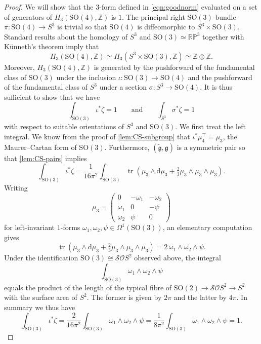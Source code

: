 \documentclass[10pt,a4paper]{amsart}
\newcommand\Cal{\mathcal}
\newcommand{\Z}{\mathbb{Z}}
\newcommand{\col}{:}
\renewcommand*{\d}{\mathrm{d}}
\newcommand{\tr}{\operatorname{tr}}
\begin{document}
\begin{proof}
We will show that the $3$-form defined in \eqref{eqn:goodnorm} evaluated on a set of
generators of $H_3(\mathrm{SO}(4),\Z)$ is $1$.  The principal right
$\mathrm{SO}(3)$-bundle $\pi \col \mathrm{SO}(4) \to S^3$ is trivial so that
$\mathrm{SO}(4)$ is diffeomorphic to $S^3\times \mathrm{SO}(3)$. Standard results
about the homology of $S^3$ and $\mathrm{SO}(3)\simeq \mathbb{RP}^3$ together with
K\"unneth's theorem imply that
\[
H_3(\mathrm{SO}(4),\Z)\simeq H_3(S^3\times \mathrm{SO}(3),\Z)\simeq \Z \oplus \Z. 
\]
Moreover, $H_3(\mathrm{SO}(4),\Z)$ is generated by the pushforward of the fundamental
class of $\mathrm{SO}(3)$ under the inclusion $\iota \col \mathrm{SO}(3) \to
\mathrm{SO}(4)$ and the pushforward of the fundamental class of $S^3$ under a section
$\sigma \col S^3 \to \mathrm{SO}(4)$. It is thus sufficient to show that we have
\begin{equation}\label{eqn:integrals}
\int_{\mathrm{SO}(3)}\iota^*\zeta=1 \qquad \text{and}\qquad \int_{S^3}\sigma^*\zeta=1
\end{equation}
with respect to suitable orientations of $S^3$ and $\mathrm{SO}(3)$. We first treat
the left integral.  We know from the proof of \cref{lem:CS-subgroup}
  that $\iota^*\mu_4^\top=\mu_3$, the Maurer--Cartan form of
$\mathrm{SO}(3)$. Furthermore, $(\tilde{\mathfrak{g}},\mathfrak{g})$ is a symmetric
pair so that \cref{lem:CS-pairs} implies
\[
\int_{\mathrm{SO}(3)}\iota^*\zeta=\frac{1}{16\pi^2}\int_{\mathrm{SO}(3)}\tr\left(\mu_3\wedge\d\mu_3+\tfrac{2}{3}\mu_3\wedge\mu_3\wedge\mu_3\right).
\]
Writing
\[
\mu_3=\begin{pmatrix} 0 & -\omega_1 & -\omega_2 \\ \omega_1 & 0 & -\psi \\ \omega_2 & \psi & 0 \end{pmatrix}
\]
for left-invariant $1$-forms $\omega_1,\omega_2,\psi \in \Omega^1(\mathrm{SO}(3))$, an elementary computation gives
\[
\tr\left(\mu_3\wedge\d\mu_3+\tfrac{2}{3}\mu_3\wedge\mu_3\wedge\mu_3\right)=2\,\omega_1\wedge\omega_2\wedge\psi.
\]
Under the identification $\mathrm{SO}(3)\cong\Cal{SO}S^2$ observed above, the integral 
\[
\int_{\mathrm{SO}(3)}\omega_1\wedge\omega_2\wedge\psi
\] 
equals the product of the length of the typical fibre of $\mathrm{SO}(2)\to \mathcal{SO}S^2 \to S^2$ with the surface area of $S^2$. The former is given by $2\pi$ and the latter by $4\pi$. In summary we thus have
\[
\int_{\mathrm{SO}(3)}\iota^*\zeta=\frac{2}{16\pi^2}\int_{\mathrm{SO}(3)}\omega_1\wedge\omega_2\wedge\psi=\frac{1}{8\pi^2}\int_{\mathrm{SO}(3)}\omega_1\wedge\omega_2\wedge\psi=1. 
\]


\end{proof}
\end{document}
